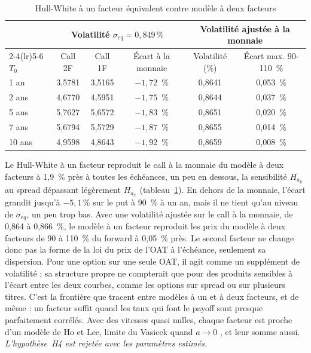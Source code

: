 \begin{table}[htbp]
\centering\small
\caption{Hull-White à un facteur équivalent contre modèle à deux facteurs}
\label{tab:h4}
\begin{tabular}{@{}lccccc@{}}
\toprule
 & \multicolumn{3}{c}{Volatilité $\sigma_{eq} = 0{,}849\,\%$} & \multicolumn{2}{c}{Volatilité ajustée à la monnaie} \\
\cmidrule(lr){2-4}\cmidrule(lr){5-6}
$T_0$ & Call 2F & Call 1F & Écart à la monnaie & Volatilité (\%) & Écart max. 90-110~\% \\
\midrule
1 an   & 3,5781 & 3,5165 & $-1{,}72$~\% & 0,8641 & 0,053~\% \\
2 ans  & 4,6770 & 4,5951 & $-1{,}75$~\% & 0,8644 & 0,037~\% \\
5 ans  & 5,7627 & 5,6572 & $-1{,}83$~\% & 0,8651 & 0,020~\% \\
7 ans  & 5,6794 & 5,5729 & $-1{,}87$~\% & 0,8655 & 0,014~\% \\
10 ans & 4,9598 & 4,8643 & $-1{,}92$~\% & 0,8659 & 0,008~\% \\
\bottomrule
\end{tabular}
\end{table}

Le Hull-White à un facteur reproduit le call à la monnaie du modèle à deux facteurs à 1,9~\% près à toutes les
échéances, un peu en dessous, la sensibilité $H_{a_y}$ au spread dépassant légèrement $H_{a_x}$
(tableau~\ref{tab:h4}). En dehors de la monnaie, l'écart grandit jusqu'à $-5{,}1\,\%$ sur le put à 90~\% à un an,
mais il ne tient qu'au niveau de $\sigma_{eq}$, un peu trop bas. Avec une volatilité ajustée sur le call à la
monnaie, de 0,864 à 0,866~\%, le modèle à un facteur reproduit les prix du modèle à deux facteurs de 90 à 110~\% du
forward à 0,05~\% près. Le second facteur ne change donc pas la forme de la loi du prix de l'OAT à l'échéance,
seulement sa dispersion. Pour une option sur une seule OAT, il agit comme un supplément de volatilité ; sa
structure propre ne compterait que pour des produits sensibles à l'écart entre les deux courbes, comme les options
sur spread ou sur plusieurs titres. C'est la frontière que tracent \citet[section~4.1]{BrigoMercurio2006} entre
modèles à un et à deux facteurs, et \citet[section~6.4.6]{Chaix2021} de même : un facteur suffit quand les taux qui
font le payoff sont presque parfaitement corrélés. Avec des vitesses quasi nulles, chaque facteur est proche d'un
modèle de Ho et Lee, limite du Vasicek quand $a \to 0$ \citep[CM3, p.~14]{Hillairet2026}, et leur somme aussi.
\emph{L'hypothèse~H4 est rejetée avec les paramètres estimés.}

